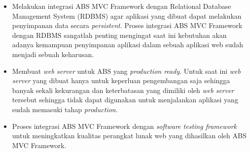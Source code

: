 \begin{itemize}
    \item Melakukan integrasi ABS MVC Framework dengan Relational Database Management System (RDBMS) agar aplikasi yang dibuat dapat melakukan penyimpanan data secara \textit{persistent}. Proses integrasi ABS MVC Framework dengan RDBMS sangatlah penting mengingat saat ini kebutuhan akan adanya kemampuan penyimpanan aplikasi dalam sebuah aplikasi web sudah menjadi sebuah keharusan.
    \item Membuat \textit{web server} untuk ABS yang \textit{production ready}. Untuk saat ini \textit{web server} yang dibuat hanya untuk keperluan pengembangan saja sehingga banyak sekali kekurangan dan keterbatasan yang dimiliki oleh \textit{web server} tersebut sehingga tidak dapat digunakan untuk menjalankan aplikasi yang sudah memasuki tahap \textit{production}.
    \item Proses integrasi ABS MVC Framework dengan \textit{software testing framework} untuk meningkatkan kualitas perangkat lunak web yang dihasilkan oleh ABS MVC Framework.
\end{itemize}